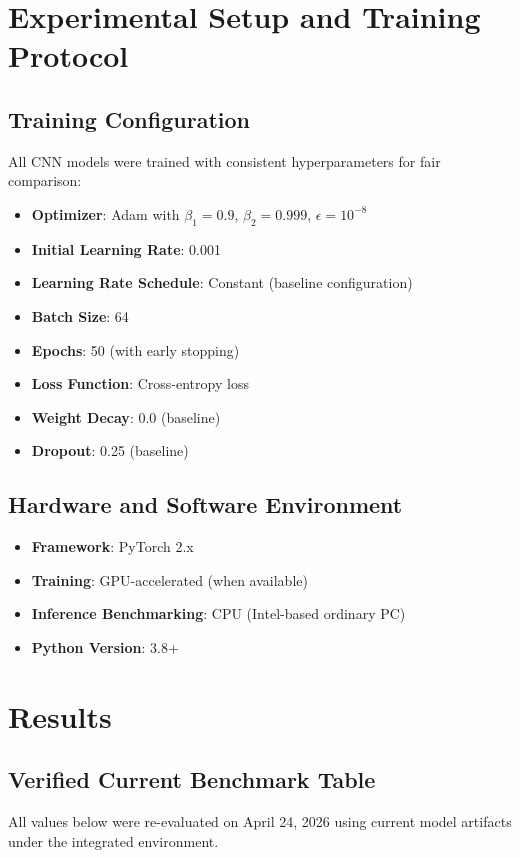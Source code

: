 \documentclass[12pt,a4paper]{article}
\begin{document}
\section{Experimental Setup and Training Protocol}

\subsection{Training Configuration}
All CNN models were trained with consistent hyperparameters for fair comparison:

\begin{itemize}[leftmargin=*]
    \item \textbf{Optimizer}: Adam with $\beta_1=0.9$, $\beta_2=0.999$, $\epsilon=10^{-8}$
    \item \textbf{Initial Learning Rate}: 0.001
    \item \textbf{Learning Rate Schedule}: Constant (baseline configuration)
    \item \textbf{Batch Size}: 64
    \item \textbf{Epochs}: 50 (with early stopping)
    \item \textbf{Loss Function}: Cross-entropy loss
    \item \textbf{Weight Decay}: 0.0 (baseline)
    \item \textbf{Dropout}: 0.25 (baseline)
\end{itemize}

\subsection{Hardware and Software Environment}
\begin{itemize}[leftmargin=*]
    \item \textbf{Framework}: PyTorch 2.x
    \item \textbf{Training}: GPU-accelerated (when available)
    \item \textbf{Inference Benchmarking}: CPU (Intel-based ordinary PC)
    \item \textbf{Python Version}: 3.8+
\end{itemize}

\section{Results}

\subsection{Verified Current Benchmark Table}
All values below were re-evaluated on April 24, 2026 using current model artifacts under the integrated environment.
\end{document}
